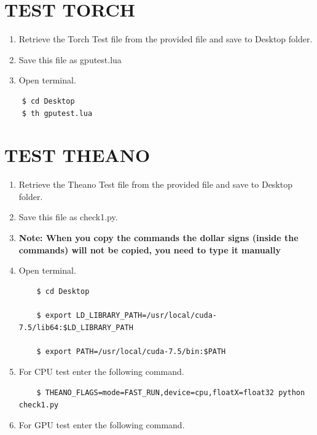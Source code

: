 \documentclass[12pt]{article}
\begin{document}
\newpage
\section{TEST TORCH}\label{TEST TORCH}
\begin{enumerate}
  \item Retrieve the Torch Test file from the provided file and save to Desktop folder.
  \item Save this file as gputest.lua

  \item Open terminal.
\end{enumerate}

\begin{lstlisting}
    $ cd Desktop
    $ th gputest.lua
\end{lstlisting}
\newpage
\section{TEST THEANO}\label{TEST THEANO}

\begin{enumerate}
  \item Retrieve the Theano Test file from the provided file and save to Desktop folder.
  \item Save this file as check1.py.
  \item \textbf{Note: When you copy the commands the dollar signs (inside the commands) will not be copied, you need to type it manually}



  \item Open terminal.

\begin{lstlisting}
    $ cd Desktop

    $ export LD_LIBRARY_PATH=/usr/local/cuda-7.5/lib64:$LD_LIBRARY_PATH

    $ export PATH=/usr/local/cuda-7.5/bin:$PATH
\end{lstlisting}

    \item For CPU test enter the following command.

\begin{lstlisting}
    $ THEANO_FLAGS=mode=FAST_RUN,device=cpu,floatX=float32 python check1.py
\end{lstlisting}

    \item For GPU test enter the following command.
\end{enumerate}
\end{document}
